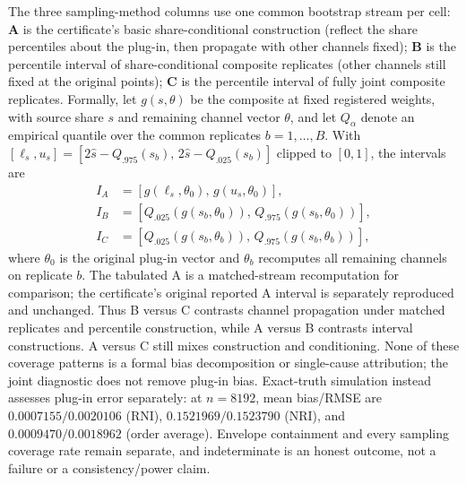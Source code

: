 The three sampling-method columns use one common bootstrap stream per cell:
\textbf{A} is the certificate's basic share-conditional construction (reflect
the share percentiles about the plug-in, then propagate with other channels
fixed); \textbf{B} is the percentile interval of share-conditional composite
replicates (other channels still fixed at the original points); \textbf{C} is
the percentile interval of fully joint composite replicates. Formally, let
$g(s,\theta)$ be the composite at fixed registered weights, with source share
$s$ and remaining channel vector $\theta$, and let $Q_\alpha$ denote an empirical
quantile over the common replicates $b=1,\dots,B$. With
$[\ell_s,u_s]=[2\hat s-Q_{.975}(s_b),\,2\hat s-Q_{.025}(s_b)]$ clipped to
$[0,1]$, the intervals are
\begin{align}
I_A&=[g(\ell_s,\theta_0),\,g(u_s,\theta_0)],\label{eq:interval-a}\\
I_B&=[Q_{.025}(g(s_b,\theta_0)),\,Q_{.975}(g(s_b,\theta_0))],
  \label{eq:interval-b}\\
I_C&=[Q_{.025}(g(s_b,\theta_b)),\,Q_{.975}(g(s_b,\theta_b))],
  \label{eq:interval-c}
\end{align}
where $\theta_0$ is the original plug-in vector and $\theta_b$ recomputes all
remaining channels on replicate $b$. The tabulated A is a matched-stream
recomputation for comparison; the certificate's original reported A interval is
separately reproduced and unchanged. Thus B versus C contrasts channel
propagation under matched replicates and percentile construction, while A
versus B contrasts interval constructions. A versus C still mixes construction
and conditioning. None of these coverage patterns is a formal bias
decomposition or single-cause attribution; the joint diagnostic does not remove
plug-in bias. Exact-truth simulation instead assesses plug-in
error separately: at $n=8192$, mean bias/RMSE are
$0.0007155/0.0020106$ (RNI), $0.1521969/0.1523790$ (NRI), and
$0.0009470/0.0018962$ (order average). Envelope containment and every sampling
coverage rate remain separate, and indeterminate is an honest outcome, not a
failure or a consistency/power claim.

